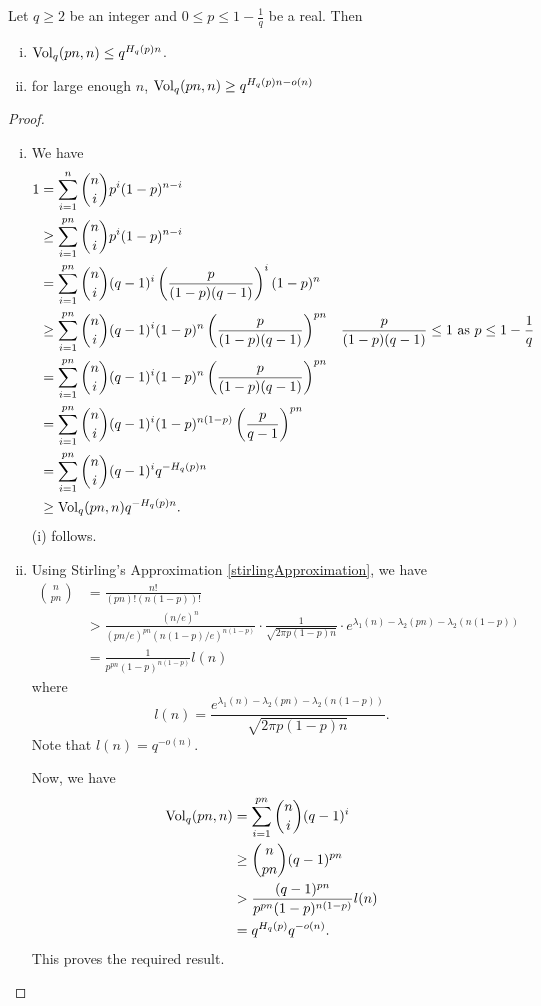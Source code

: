 \begin{theorem}
\label{volumeBound1}
    Let $q\geq 2$ be an integer and $0\leq p\leq 1-\frac{1}{q}$ be a real. Then
    \begin{enumerate}[(i)]
        \item $\operatorname{Vol}_q(pn,n)\leq q^{H_q(p)n}$.
        \item for large enough $n$, $\operatorname{Vol}_q(pn,n)\geq q^{H_q(p)n-o(n)}$
    \end{enumerate}
\end{theorem}
\begin{proof}
\phantom{owo}
\begin{enumerate}[(i)]
    \item We have
    \begin{align*}
        1 &= \sum_{i=1}^n\binom{n}{i}p^i(1-p)^{n-i} \\
          &\geq \sum_{i=1}^{pn}\binom{n}{i} p^i(1-p)^{n-i} \\
          &= \sum_{i=1}^{pn}\binom{n}{i} (q-1)^i \left(\frac{p}{(1-p)(q-1)}\right)^i (1-p)^n \\
          &\geq \sum_{i=1}^{pn}\binom{n}{i} (q-1)^i(1-p)^n \left(\frac{p}{(1-p)(q-1)}\right)^{pn} & \text{$\frac{p}{(1-p)(q-1)}\leq 1$ as $p\leq 1-\frac{1}{q}$} \\
          &= \sum_{i=1}^{pn}\binom{n}{i} (q-1)^i(1-p)^n \left(\frac{p}{(1-p)(q-1)}\right)^{pn} \\
          &= \sum_{i=1}^{pn}\binom{n}{i} (q-1)^i(1-p)^{n(1-p)} \left(\frac{p}{q-1}\right)^{pn}\\
          &= \sum_{i=1}^{pn}\binom{n}{i} (q-1)^i q^{-H_q(p)n}\\
          &\geq \operatorname{Vol}_q(pn,n)q^{-H_q(p)n}.
    \end{align*}
    (i) follows.
    
    \item Using Stirling's Approximation \ref{stirlingApproximation}, we have
    \begin{align*}
        \binom{n}{pn} &= \frac{n!}{(pn)!(n(1-p))!} \\
                      &> \frac{(n/e)^n}{(pn/e)^{pn} (n(1-p)/e)^{n(1-p)}} \cdot \frac{1}{\sqrt{2\pi p(1-p)n}}\cdot e^{\lambda_1(n)-\lambda_2(pn)-\lambda_2(n(1-p))} \\
                      &= \frac{1}{p^{pn}(1-p)^{n(1-p)}} l(n)
    \end{align*}
    where $$l(n)=\frac{e^{\lambda_1(n)-\lambda_2(pn)-\lambda_2(n(1-p))}}{\sqrt{2\pi p(1-p)n}}.$$ Note that $l(n)=q^{-o(n)}$.
    
    Now, we have
    \begin{align*}
        \operatorname{Vol}_q(pn,n)&= \sum_{i=1}^{pn}\binom{n}{i}(q-1)^i \\
                    &\geq \binom{n}{pn}(q-1)^{pn} \\
                    &> \frac{(q-1)^{pn}}{p^{pn}(1-p)^{n(1-p)}} l(n) \\
                    &= q^{H_q(p)} q^{-o(n)}.
    \end{align*}
    This proves the required result.
\end{enumerate}
\end{proof}

